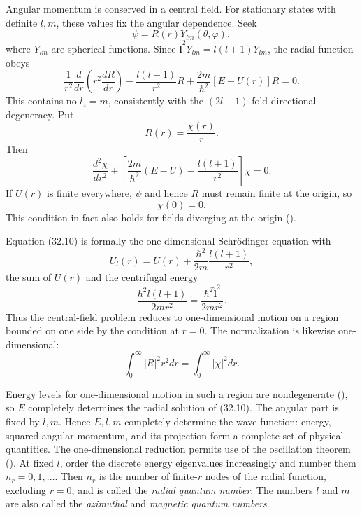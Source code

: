 Angular momentum is conserved in a central field. For stationary states with
definite $l,m$, these values fix the angular dependence. Seek
\begin{equation}\psi=R(r)Y_{lm}(\theta,\varphi),\tag{32.7}\end{equation}
where $Y_{lm}$ are spherical functions. Since
$\hat{\mathbf l}^2Y_{lm}=l(l+1)Y_{lm}$, the radial function obeys
\begin{equation}
 \frac1{r^2}\frac d{dr}\left(r^2\frac{dR}{dr}\right)-\frac{l(l+1)}{r^2}R
 +\frac{2m}{\hbar^2}[E-U(r)]R=0.\tag{32.8}
\end{equation}
This contains no $l_z=m$, consistently with the $(2l+1)$-fold directional
degeneracy. Put
\begin{equation}R(r)=\frac{\chi(r)}r.\tag{32.9}\end{equation}
Then
\begin{equation}
 \frac{d^2\chi}{dr^2}+\left[\frac{2m}{\hbar^2}(E-U)-\frac{l(l+1)}{r^2}\right]\chi=0.
 \tag{32.10}
\end{equation}
If $U(r)$ is finite everywhere, $\psi$ and hence $R$ must remain finite at
the origin, so
\begin{equation}\chi(0)=0.\tag{32.11}\end{equation}
This condition in fact also holds for fields diverging at the origin ().

Equation (32.10) is formally the one-dimensional Schrödinger equation with
\begin{equation}
 U_l(r)=U(r)+\frac{\hbar^2}{2m}\frac{l(l+1)}{r^2},\tag{32.12}
\end{equation}
the sum of $U(r)$ and the centrifugal energy
\[\frac{\hbar^2l(l+1)}{2mr^2}=\frac{\hbar^2\hat{\mathbf l}^2}{2mr^2}.\]
Thus the central-field problem reduces to one-dimensional motion on a region
bounded on one side by the condition at $r=0$. The normalization is likewise
one-dimensional:
\[\int_0^\infty|R|^2r^2dr=\int_0^\infty|\chi|^2dr.\]

Energy levels for one-dimensional motion in such a region are nondegenerate
(), so $E$ completely determines the radial solution of (32.10). The
angular part is fixed by $l,m$. Hence $E,l,m$ completely determine the wave
function: energy, squared angular momentum, and its projection form a
complete set of physical quantities.
The one-dimensional reduction permits use of the oscillation theorem
(). At fixed $l$, order the discrete energy eigenvalues increasingly and
number them $n_r=0,1,\ldots$. Then $n_r$ is the number of finite-$r$ nodes of
the radial function, excluding $r=0$, and is called the \emph{radial quantum
number}. The numbers $l$ and $m$ are also called the \emph{azimuthal} and
\emph{magnetic quantum numbers}.

